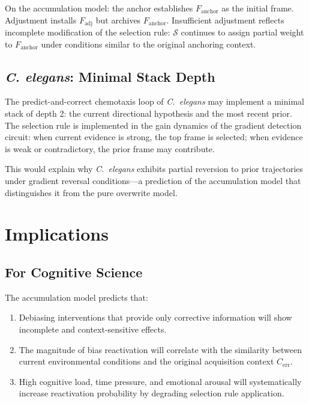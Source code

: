 \documentclass[12pt]{article}
\begin{document}
On the accumulation model: the anchor establishes $F_\mathrm{anchor}$
as the initial frame. Adjustment installs $F_\mathrm{adj}$ but
archives $F_\mathrm{anchor}$.
Insufficient adjustment reflects incomplete modification of the
selection rule: $\mathcal{S}$ continues to assign partial weight
to $F_\mathrm{anchor}$ under conditions similar to the original
anchoring context.

\subsection{\textit{C. elegans}: Minimal Stack Depth}

The predict-and-correct chemotaxis loop of \textit{C.~elegans}
\cite{bargmann2006} may implement a minimal stack of depth 2:
the current directional hypothesis and the most recent prior.
The selection rule is implemented in the gain dynamics of the
gradient detection circuit: when current evidence is strong,
the top frame is selected; when evidence is weak or contradictory,
the prior frame may contribute.

This would explain why \textit{C.~elegans} exhibits partial
reversion to prior trajectories under gradient reversal
conditions---a prediction of the accumulation model that
distinguishes it from the pure overwrite model.

\section{Implications}

\subsection{For Cognitive Science}

The accumulation model predicts that:
\begin{enumerate}
  \item Debiasing interventions that provide only corrective
  information will show incomplete and context-sensitive effects.
  \item The magnitude of bias reactivation will correlate with
  the similarity between current environmental conditions and
  the original acquisition context $C_\mathrm{err}$.
  \item High cognitive load, time pressure, and emotional arousal
  will systematically increase reactivation probability by
  degrading selection rule application.
\end{enumerate}
\end{document}
